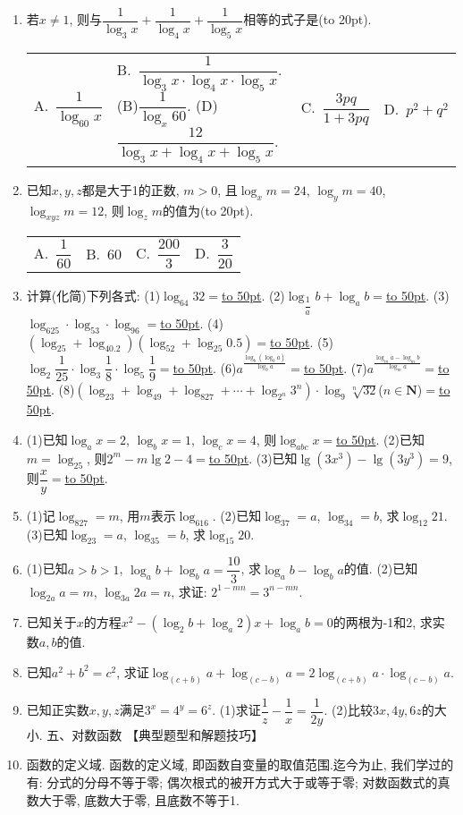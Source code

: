 \documentclass[10pt,a4paper]{article}
\newcommand{\blank}[1]{\underline{\hbox to #1pt{}}}
\newcommand{\bracket}[1]{(\hbox to #1pt{})}
\newcommand{\fourch}[4]{\par\begin{tabular}{p{.23\textwidth}p{.23\textwidth}p{.23\textwidth}p{.23\textwidth}}
A.~#1 &B.~#2& C.~#3& D.~#4
\end{tabular}}
\begin{document}
\begin{enumerate}[1.]
\fourch{$\dfrac 14$}{$\dfrac{\sqrt 2}2$}{$\sqrt 2$}{4}
\item 若$x\ne 1$, 则与$\dfrac 1{\log _3x}+\dfrac 1{\log _4x}+\dfrac 1{\log _5x}$相等的式子是\bracket{20}.
\fourch{$\dfrac 1{\log _{60}x}$}{$\dfrac 1{\log _3x\cdot \log _4x\cdot \log _5x}$.
(B)$\dfrac 1{\log _x60}$.							(D)$\dfrac{12}{\log _3x+\log _4x+\log _5x}$.
\item 若$\log _83=p$, $\log _35=q$, 则$\lg 5$(用$p,q$表示)等于\bracket{20}.
(A)$\dfrac{3p+q}5$.		(B)$\dfrac{1+3pq}{p+q}$}{$\dfrac{3pq}{1+3pq}$}{$p^2+q^2$}
\item 已知$x,y,z$都是大于1的正数, $m>0$, 且$\log _xm=24$, $\log _ym=40$, $\log _{xyz}m=12$, 则$\log _zm$的值为\bracket{20}.
\fourch{$\dfrac 1{60}$}{60}{$\dfrac{200}3$}{$\dfrac 3{20}$}
\item 计算(化简)下列各式:
(1)$\log _{64}32=$\blank{50}.
(2)$\log _{\dfrac 1a}b+\log _ab=$\blank{50}.
(3)$\log _625\cdot \log _53\cdot \log _96=$\blank{50}.
(4)$(\log _25+\log _40.2)(\log _52+\log _{25}0.5)=$\blank{50}.
(5)$\log _2\dfrac 1{25}\cdot \log _3\dfrac 18\cdot \log _5\dfrac 19=$\blank{50}.
(6)$a^{\frac{\log _b(\log _ba)}{\log _ba}}=$\blank{50}.
(7)$a^{\frac{\log _ma-\log _mb}{\log _ma}}=$\blank{50}.
(8)$(\log _23+\log _49+\log _827+\cdots +\log _{2^n}3^n)\cdot \log _9\sqrt [n]{32}$($n\in \mathbf{N}$)$=$\blank{50}.
\item (1)已知$\log _ax=2$, $\log _bx=1$, $\log _cx=4$, 则$\log _{abc}x=$\blank{50}.
(2)已知$m=\log _25$, 则$2^m-m\lg 2-4=$\blank{50}.
(3)已知$\lg (3x^3)-\lg (3y^3)=9$, 则$\dfrac xy=$\blank{50}.
\item (1)记$\log _827=m$, 用$m$表示$\log _616$.
(2)已知$\log _37=a$, $\log _34=b$, 求$\log _{12}21$.
(3)已知$\log _23=a$, $\log _35=b$, 求$\log _{15}20$.
\item (1)已知$a>b>1$, $\log _ab+\log _ba=\dfrac{10}3$, 求$\log _ab-\log _ba$的值.
(2)已知$\log _{2a}a=m$, $\log _{3a}2a=n$, 求证: $2^{1-mn}=3^{n-mn}$.
\item 已知关于$x$的方程$x^2-(\log _2b+\log _a2)x+\log _ab=0$的两根为-1和2, 求实数$a,b$的值.
\item 已知$a^2+b^2=c^2$, 求证$\log _{(c+b)}a+\log _{(c-b)}a=2\log _{(c+b)}a\cdot \log _{(c-b)}a$.
\item 已知正实数$x,y,z$满足$3^x=4^y=6^z$.
(1)求证$\dfrac 1z-\dfrac 1x=\dfrac 1{2y}$.
(2)比较$3x,4y,6z$的大小.
五、对数函数
【典型题型和解题技巧】
\item 函数的定义域.
函数的定义域, 即函数自变量的取值范围.迄今为止, 我们学过的有: 分式的分母不等于零; 偶次根式的被开方式大于或等于零; 对数函数式的真数大于零, 底数大于零, 且底数不等于1.

\end{enumerate}
\end{document}
